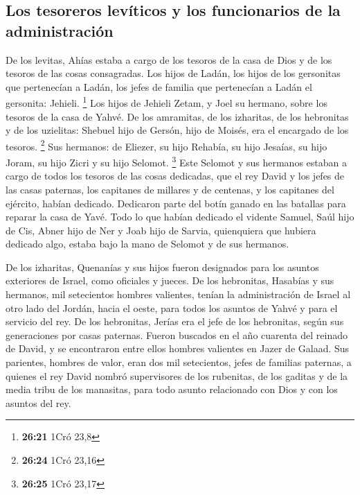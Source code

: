 \begin{paracol}{2}
\hypertarget{los-tesoreros-levuxedticos-y-los-funcionarios-de-la-administraciuxf3n}{%
\subsection{Los tesoreros levíticos y los funcionarios de la
administración}\label{los-tesoreros-levuxedticos-y-los-funcionarios-de-la-administraciuxf3n}}

 De los levitas, Ahías estaba a cargo de los tesoros de
la casa de Dios y de los tesoros de las cosas consagradas.
 Los hijos de Ladán, los hijos de los gersonitas que
pertenecían a Ladán, los jefes de familia que pertenecían a Ladán el
gersonita: Jehieli. \footnote{\textbf{26:21} 1Cró 23,8} 
Los hijos de Jehieli Zetam, y Joel su hermano, sobre los tesoros de la
casa de Yahvé.  De los amramitas, de los izharitas, de
los hebronitas y de los uzielitas:  Shebuel hijo de
Gersón, hijo de Moisés, era el encargado de los tesoros. \footnote{\textbf{26:24}
  1Cró 23,16}  Sus hermanos: de Eliezer, su hijo Rehabía,
su hijo Jesaías, su hijo Joram, su hijo Zicri y su hijo Selomot.
\footnote{\textbf{26:25} 1Cró 23,17}  Este Selomot y sus
hermanos estaban a cargo de todos los tesoros de las cosas dedicadas,
que el rey David y los jefes de las casas paternas, los capitanes de
millares y de centenas, y los capitanes del ejército, habían dedicado.
 Dedicaron parte del botín ganado en las batallas para
reparar la casa de Yavé.  Todo lo que habían dedicado el
vidente Samuel, Saúl hijo de Cis, Abner hijo de Ner y Joab hijo de
Sarvia, quienquiera que hubiera dedicado algo, estaba bajo la mano de
Selomot y de sus hermanos.

 De los izharitas, Quenanías y sus hijos fueron
designados para los asuntos exteriores de Israel, como oficiales y
jueces.  De los hebronitas, Hasabías y sus hermanos, mil
setecientos hombres valientes, tenían la administración de Israel al
otro lado del Jordán, hacia el oeste, para todos los asuntos de Yahvé y
para el servicio del rey.  De los hebronitas, Jerías era
el jefe de los hebronitas, según sus generaciones por casas paternas.
Fueron buscados en el año cuarenta del reinado de David, y se
encontraron entre ellos hombres valientes en Jazer de Galaad.
 Sus parientes, hombres de valor, eran dos mil
setecientos, jefes de familias paternas, a quienes el rey David nombró
supervisores de los rubenitas, de los gaditas y de la media tribu de los
manasitas, para todo asunto relacionado con Dios y con los asuntos del
rey.


\end{paracol}
